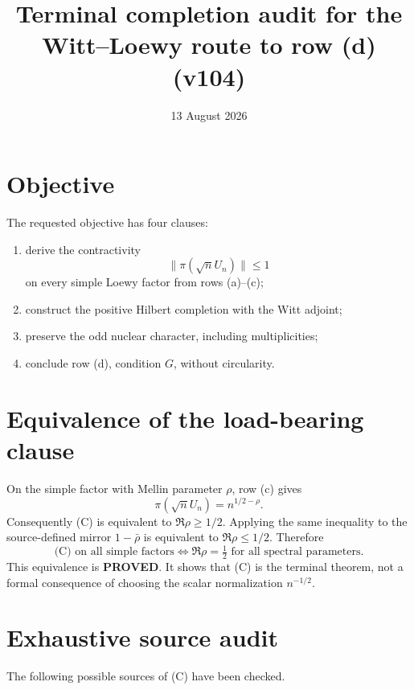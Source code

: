 \documentclass[11pt]{article}
\title{Terminal completion audit for the Witt--Loewy route to row (d) (v104)}
\date{13 August 2026}
\newcommand{\PROVED}{\textcolor{green!40!black}{\textbf{PROVED}}}
\begin{document}
\maketitle

\section{Objective}

The requested objective has four clauses:
\begin{enumerate}
\item derive the contractivity
\begin{equation}
 \|\pi(\sqrt nU_n)\|\le1                              \tag{C}
\end{equation}
on every simple Loewy factor from rows (a)--(c);
\item construct the positive Hilbert completion with the Witt adjoint;
\item preserve the odd nuclear character, including multiplicities;
\item conclude row (d), condition $G$, without circularity.
\end{enumerate}

\section{Equivalence of the load-bearing clause}

On the simple factor with Mellin parameter $\rho$, row (c) gives
\begin{equation}
                 \pi(\sqrt nU_n)=n^{1/2-\rho}.        \tag{1}
\end{equation}
Consequently (C) is equivalent to $\Re\rho\ge1/2$.  Applying the same
inequality to the source-defined mirror $1-\bar\rho$ is equivalent to
$\Re\rho\le1/2$.  Therefore
\begin{equation}
 \boxed{\text{(C) on all simple factors}
 \iff \Re\rho=\tfrac12\text{ for all spectral parameters}.}  \tag{2}
\end{equation}
This equivalence is \PROVED.  It shows that (C) is the terminal theorem,
not a formal consequence of choosing the scalar normalization $n^{-1/2}$.

\section{Exhaustive source audit}

The following possible sources of (C) have been checked.
\end{document}
